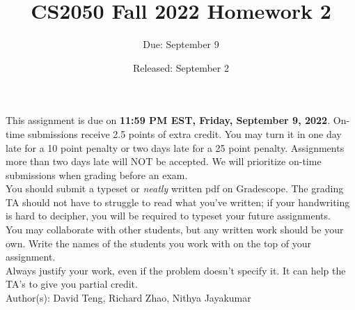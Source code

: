 \documentclass{article}
\title{CS2050 Fall 2022 Homework 2}
\author{Due: September 9}
\date{Released: September 2}
\begin{document}
\maketitle

This assignment is due on \textbf{11:59 PM EST, Friday, September 9, 2022}.  On-time submissions receive 2.5 points of extra credit. You may turn it in one day late for a 10 point penalty or two days late for a 25 point penalty. Assignments more than two days late will NOT be accepted.  We will prioritize on-time submissions when grading before an exam. \\ 

You should submit a typeset or \emph{neatly} written pdf on Gradescope.  The grading TA should not have to struggle to read what you've written; if your handwriting is hard to decipher, you will be required to typeset your future assignments.\\ 

You may collaborate with other students, but any written work should be your own. Write the names of the students you work with on the top of your assignment.\\

Always justify your work, even if the problem doesn't specify it. It can help the TA's to give you partial credit.
\\

Author(s): David Teng, Richard Zhao, Nithya Jayakumar

\clearpage
\end{document}
